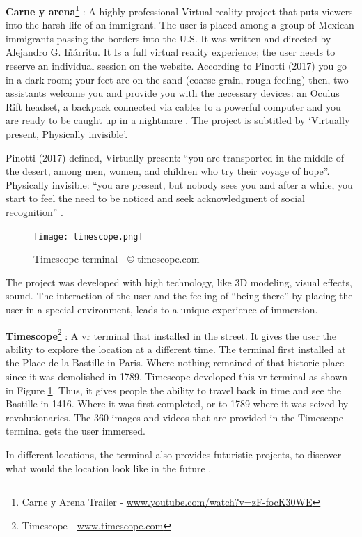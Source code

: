 \textbf{Carne y arena}\footnote{Carne y Arena Trailer - \url{www.youtube.com/watch?v=zF-focK30WE}} : A highly professional
Virtual reality project that puts viewers
into the harsh life of an immigrant. The
user is placed among a group of
Mexican immigrants passing the
borders into the U.S. It was written and
directed by Alejandro G. Iñárritu. 
It Is a full virtual reality experience; the user
needs to reserve an individual session
on the website. According to Pinotti (2017) you go in a dark room; your feet are on the sand (coarse grain, rough feeling) then, two assistants welcome you and provide you with the
necessary devices: an Oculus Rift headset, a backpack connected via cables to a powerful
computer and you are ready to be caught up in a nightmare \citep{Pinotti2017}. The project is
subtitled by ‘Virtually present, Physically invisible’. 


Pinotti (2017) defined, Virtually present:
“you are transported in the middle of the desert, among men, women, and children who try
their voyage of hope”. Physically invisible: “you are present, but nobody sees you and after a
while, you start to feel the need to be noticed and seek acknowledgment of social
recognition” \citep{Pinotti2017}. 
\begin{figure}
    \centering
    \texttt{[image: timescope.png]}
    \caption{Timescope terminal - © timescope.com }
    \label{fig:timescope}
\end{figure}
The project was developed with high technology, like 3D
modeling, visual effects, sound. The interaction of the user and the feeling of “being there”
by placing the user in a special environment, leads to a unique experience of immersion.

\textbf{Timescope}\footnote{Timescope - \url{www.timescope.com}} : A \acrshort{vr} terminal that installed in the street. It gives the user the ability to explore the location at a different time. The terminal first installed at the Place de la Bastille in Paris. Where nothing remained of that historic place since it was demolished in 1789. Timescope developed this \acrshort{vr} terminal as shown in Figure \ref{fig:timescope}. Thus, it gives people the ability to travel back in time and see the Bastille in 1416. Where it was first completed, or to 1789 where it was seized by revolutionaries. The 360 images and videos that are provided in the Timescope terminal gets the user immersed.

In different locations, the terminal also provides futuristic projects, to discover what would the location look like in the future \citep{Hiner2016HowTechRepublic}. 

